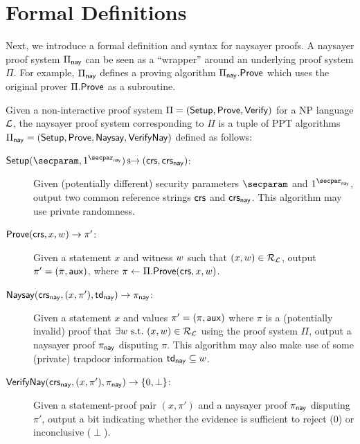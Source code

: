 \section{Formal Definitions}\label{sec:naysayer_def}

Next, we introduce a formal definition and syntax for naysayer proofs. A naysayer proof system $\Pi_{\mathsf{nay}}$ can be seen as a ``wrapper'' around an underlying proof system $\Pi$. For example, $\Pi_{\sf nay}$ defines a proving algorithm $\Pi_{\mathsf{nay}}.\mathsf{Prove}$ which uses the original prover $\Pi.\mathsf{Prove}$ as a subroutine.

\begin{definition}\label{def:naysayer_proof}
Given a non-interactive proof system $\Pi = (\mathsf{Setup}, \mathsf{Prove}, \mathsf{Verify})$ for a NP language $\mathcal{L}$, the naysayer proof system corresponding to $\Pi$ is a tuple of PPT algorithms $\Pi_{\mathsf{nay}} = (\mathsf{Setup}, \mathsf{Prove},\allowbreak \mathsf{Naysay},\allowbreak {\ensuremath{\mathsf{Verify}}}\mathsf{Nay})$ defined as follows:
    \begin{description}
        \item[$\Setup(\secparam, \naysecparam) \randout (\crs,\crs_{\nay})$:] Given (potentially different) security parameters $\secparam$ and $\naysecparam$, output two common reference strings $\mathsf{crs}$ and $\mathsf{crs}_{\mathsf{nay}}$. This algorithm may use private randomness.
        \item[$\mathsf{Prove}(\mathsf{crs}, x, w) \to \pi'$:] Given a statement $x$ and witness $w$ such that $(x,\allowbreak w) \in \mathcal{R}_{\mathcal{L}}$, 
        output $\pi' = (\pi, \mathsf{aux})$, where $\pi \gets \Pi.\mathsf{Prove}(\mathsf{crs}, x, w)$.
        \item[$\mathsf{Naysay}(\mathsf{crs}_{\mathsf{nay}}, (x,\pi'), \mathsf{td}_{\mathsf{nay}}) \rightarrow \pi_{\mathsf{nay}}$:] Given a statement $x$ and values $\pi' = (\pi,\allowbreak \mathsf{aux})$ where $\pi$ is a (potentially invalid) proof that $\exists w \mathrm{~s.t.~} (x,w) \in \mathcal{R}_{\mathcal{L}}$ using the proof system $\Pi$, output a naysayer proof $\pi_{\mathsf{nay}}$ disputing $\pi$. This algorithm may also make use of some (private) trapdoor information $\mathsf{td}_{\mathsf{nay}} \subseteq w$.
        \item[${\mathsf{Verify}}\mathsf{Nay}(\mathsf{crs}_{\mathsf{nay}}, (x,\pi'), \pi_{\mathsf{nay}}) \rightarrow \{0, \perp\}$:] Given a statement-proof pair $(x,\allowbreak \pi')$ and a naysayer proof $\pi_{\mathsf{nay}}$ disputing $\pi'$, output a bit indicating whether the evidence is sufficient to reject (0) or inconclusive ($\perp$).
    \end{description}
\end{definition}

